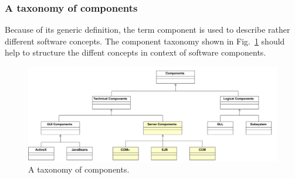 \subsubsection{A taxonomy of components}

Because of its generic definition, the term component is used to describe
rather different software concepts.
The component taxonomy shown in Fig.~\ref{ComponentTaxonomy} should 
help to structure the diffent concepts in context of software components.

\begin{figure}[htbp]
    \begin{center}
        \includegraphics [width=15cm,angle=0] {ComponentBasedSoftwareEngineering/uml/ComponentTaxonomy}
        \caption{A taxonomy of components.}
        \label{ComponentTaxonomy}
    \end{center}
\end{figure}

